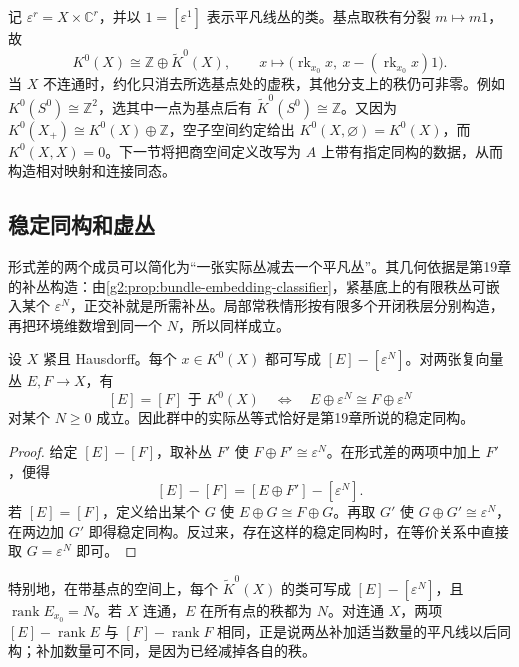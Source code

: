 记 \(\varepsilon^r=X\times\mathbb C^r\)，并以 \(1=[\varepsilon^1]\) 表示平凡线丛的类。基点取秩有分裂 \(m\mapsto m1\)，故
\begin{equation}\label{g2:eq:k-rank-splitting}
	K^0(X)\cong\mathbb Z\oplus\widetilde K^0(X),\qquad
	x\longmapsto\bigl(\operatorname{rk}_{x_0}x,\ x-(\operatorname{rk}_{x_0}x)1\bigr).
\end{equation}
当 \(X\) 不连通时，约化只消去所选基点处的虚秩，其他分支上的秩仍可非零。例如 \(K^0(S^0)\cong\mathbb Z^2\)，选其中一点为基点后有 \(\widetilde K^0(S^0)\cong\mathbb Z\)。又因为 \(K^0(X_+)\cong K^0(X)\oplus\mathbb Z\)，空子空间约定给出 \(K^0(X,\varnothing)=K^0(X)\)，而 \(K^0(X,X)=0\)。下一节将把商空间定义改写为 \(A\) 上带有指定同构的数据，从而构造相对映射和连接同态。

\subsection{稳定同构和虚丛}
\label{g2:subsec:2401:02}
形式差的两个成员可以简化为“一张实际丛减去一个平凡丛”。其几何依据是第19章的补丛构造：由\cref{g2:prop:bundle-embedding-classifier}，紧基底上的有限秩丛可嵌入某个 \(\varepsilon^N\)，正交补就是所需补丛。局部常秩情形按有限多个开闭秩层分别构造，再把环境维数增到同一个 \(N\)，所以同样成立。

\begin{proposition}\label{g2:prop:k-stable-equality}
	设 \(X\) 紧且 Hausdorff。每个 \(x\in K^0(X)\) 都可写成 \([E]-[\varepsilon^N]\)。对两张复向量丛 \(E,F\to X\)，有
	\[
		[E]=[F]\text{ 于 }K^0(X)
		\quad\Longleftrightarrow\quad
		E\oplus\varepsilon^N\cong F\oplus\varepsilon^N
	\]
	对某个 \(N\ge0\) 成立。因此群中的实际丛等式恰好是第19章所说的稳定同构。
\end{proposition}
\begin{proof}
	给定 \([E]-[F]\)，取补丛 \(F'\) 使 \(F\oplus F'\cong\varepsilon^N\)。在形式差的两项中加上 \(F'\)，便得
	\[
		[E]-[F]=[E\oplus F']-[\varepsilon^N].
	\]
	若 \([E]=[F]\)，定义给出某个 \(G\) 使 \(E\oplus G\cong F\oplus G\)。再取 \(G'\) 使 \(G\oplus G'\cong\varepsilon^N\)，在两边加 \(G'\) 即得稳定同构。反过来，存在这样的稳定同构时，在等价关系中直接取 \(G=\varepsilon^N\) 即可。
\end{proof}

特别地，在带基点的空间上，每个 \(\widetilde K^0(X)\) 的类可写成 \([E]-[\varepsilon^N]\)，且 \(\operatorname{rank}E_{x_0}=N\)。若 \(X\) 连通，\(E\) 在所有点的秩都为 \(N\)。对连通 \(X\)，两项 \([E]-\operatorname{rank}E\) 与 \([F]-\operatorname{rank}F\) 相同，正是说两丛补加适当数量的平凡线以后同构；补加数量可不同，是因为已经减掉各自的秩。

